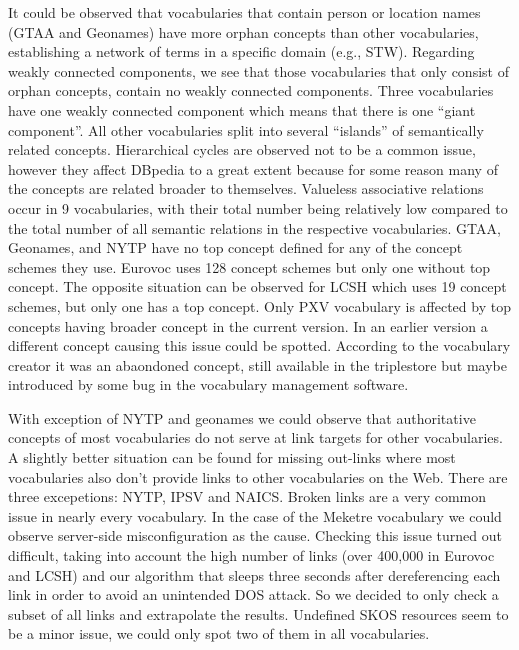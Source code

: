 It could be observed that vocabularies that contain person or location names (GTAA and Geonames) have more orphan concepts than other vocabularies, establishing a network of terms in a specific domain (e.g., STW). Regarding weakly connected components, we see that those vocabularies that only consist of orphan concepts, contain no weakly connected components. Three vocabularies have one weakly connected component which means that there is one ``giant component''. All other vocabularies split into several ``islands'' of semantically related concepts. Hierarchical cycles are observed not to be a common issue, however they affect DBpedia to a great extent because for some reason many of the concepts are related broader to themselves. Valueless associative relations occur in 9 vocabularies, with their total number being relatively low compared to the total number of all semantic relations in the respective vocabularies. GTAA, Geonames, and NYTP have no top concept defined for any of the concept schemes they use. Eurovoc uses 128 concept schemes but only one without top concept. The opposite situation can be observed for LCSH which uses 19 concept schemes, but only one has a top concept. Only PXV vocabulary is affected by top concepts having broader concept in the current version. In an earlier version a different concept causing this issue could be spotted. According to the vocabulary creator it was an abaondoned concept, still available in the triplestore but maybe introduced by some bug in the vocabulary management software.

With exception of NYTP and geonames we could observe that authoritative concepts of most vocabularies do not serve at link targets for other vocabularies. A slightly better situation can be found for missing out-links where most vocabularies also don't provide links to other vocabularies on the Web. There are three excepetions:  NYTP, IPSV and NAICS. Broken links are a very common issue in nearly every vocabulary. In the case of the Meketre vocabulary we could observe server-side misconfiguration as the cause. Checking this issue turned out difficult, taking into account the high number of links (over 400,000 in Eurovoc and LCSH) and our algorithm that sleeps three seconds after dereferencing each link in order to avoid an unintended DOS attack. So we decided to only check a subset of all links and extrapolate the results. Undefined SKOS resources seem to be a minor issue, we could only spot two of them in all vocabularies. 


